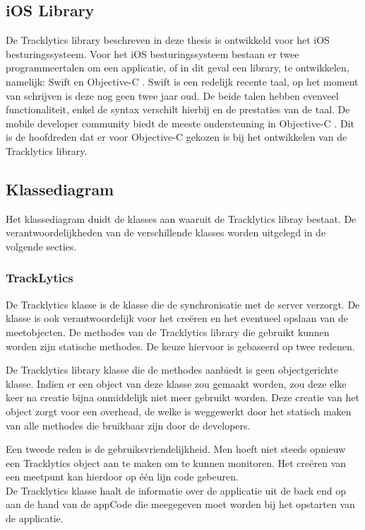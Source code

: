 \subsection{iOS Library}
De Tracklytics library beschreven in deze thesis is ontwikkeld voor het iOS besturingssysteem. Voor het iOS besturingssysteem bestaan er twee programmeertalen om een applicatie, of in dit geval een library, te ontwikkelen, namelijk: Swift\cite{Swift} en Objective-C \cite{ObjectiveC}. Swift is een redelijk recente taal, op het moment van schrijven is deze nog geen twee jaar oud. De beide talen hebben evenveel functionaliteit, enkel de syntax verschilt hierbij en de prestaties van de taal. De mobile developer community biedt de meeste ondersteuning in Objective-C \cite{SwiftVSObjectiveC}. Dit is de hoofdreden dat er voor Objective-C gekozen is bij het ontwikkelen van de Tracklytics library.


\subsection{Klassediagram}
Het klassediagram duidt de klasses aan waaruit de Tracklytics libray bestaat. De verantwoordelijkheden van de verschillende klasses worden uitgelegd in de volgende secties.

\subsubsection{TrackLytics}
De Tracklytics klasse is de klasse die de synchronisatie met de server verzorgt. De klasse is ook verantwoordelijk voor het creëren en het eventueel opslaan van de meetobjecten. De methodes van de Tracklytics library die gebruikt kunnen worden zijn statische methodes. De keuze hiervoor is gebaseerd op twee redenen.

De Tracklytics library klasse die de methodes aanbiedt is geen objectgerichte klasse. Indien er een object van deze klasse zou gemaakt worden, zou deze elke keer na creatie bijna onmiddelijk niet meer gebruikt worden. Deze creatie van het object zorgt voor een overhead, de welke is weggewerkt door het statisch maken van alle methodes die bruikbaar zijn door de developers. 

Een tweede reden is de gebruiksvriendelijkheid. Men hoeft niet steeds opnieuw een Tracklytics object aan te maken om te kunnen monitoren. Het cre\"eren van een meetpunt kan hierdoor op \'e\'en lijn code gebeuren.\\


De Tracklytics klasse haalt de informatie over de applicatie uit de back end op aan de hand van de appCode die meegegeven moet worden bij het opstarten van de applicatie.

